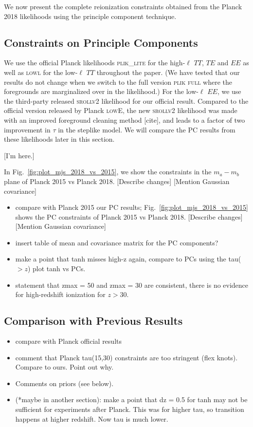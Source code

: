 \documentclass[prd,twocolumn,amsmath,amssymb,floatfix,superscriptaddress,nofootinbib]{revtex4-1}
\begin{document}
We now present the complete reionization constraints obtained from the Planck 2018 likelihoods using the principle component technique. 

\subsection{Constraints on Principle Components}

We use the official Planck likelihoods \textsc{plik\_lite} for the high-$\ell$ $TT$, $TE$ and $EE$ as well as \textsc{lowl} for the low-$\ell$ $TT$ throughout the paper. (We have tested that our results do not change when we switch to the full version \textsc{plik full} where the foregrounds are marginalized over in the likelihood.) For the low-$\ell$ $EE$, we use the third-party released \textsc{srollv2} likelihood for our official result. Compared to the official version released by Planck \textsc{lowE}, the new \textsc{srollv2} likelihood was made with an improved foreground cleaning method [cite], and leads to a factor of two improvement in $\tau$ in the steplike model. We will compare the PC results from these likelihoods later in this section.

[I'm here.]

In Fig.~\ref{fig:plot_mjs_2018_vs_2015}, we show the constraints in the $m_a-m_b$ plane of Planck 2015 vs Planck 2018. [Describe changes] [Mention Gaussian covariance]

\begin{itemize}
    \item compare with Planck 2015 our PC results; Fig.~\ref{fig:plot_mjs_2018_vs_2015} shows the PC constraints of Planck 2015 vs Planck 2018. [Describe changes] [Mention Gaussian covariance]
    \item insert table of mean and covariance matrix for the PC components?
    \item make a point that tanh misses high-z again, compare to PCs using the tau($>z$) plot tanh vs PCs.
    \item statement that zmax = 50 and zmax = 30 are consistent, there is no evidence for high-redshift ionization for $z>30$.\\
\end{itemize}


\subsection{Comparison with Previous Results}

\begin{itemize}
    \item compare with Planck official results
    \item comment that Planck tau(15,30) constraints are too stringent (flex knots). Compare to ours. Point out why.
    \item{ Comments on priors (see below).}
    \item (*maybe in  another section): make a point that dz = 0.5 for tanh may not be sufficient for experiments after Planck. This was for higher tau, so transition happens at higher redshift. Now tau is much lower.
\end{itemize}
\end{document}
